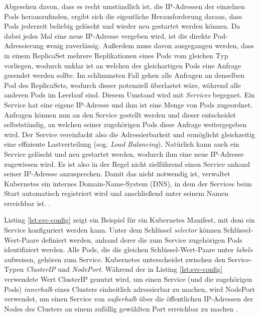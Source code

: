 \documentclass[11pt,a4paper]{article}
\begin{document}
Abgesehen davon, dass es recht umständlich ist, die IP-Adressen der einzelnen Pods herauszufinden,
ergibt sich die eigentliche Herausforderung daraus, dass Pods jederzeit beliebig gelöscht
und wieder neu gestartet werden können. Da dabei jedes Mal eine neue IP-Adresse vergeben wird,
ist die direkte Pod-Adressierung wenig zuverlässig. Außerdem muss davon ausgegangen werden, dass
in einem ReplicaSet mehrere Replikationen eines Pods vom gleichen Typ vorliegen, wodurch unklar ist
an welchen der gleichartigen Pods eine Anfrage gesendet werden sollte. Im schlimmsten Fall gehen alle Anfragen
an denselben Pod des ReplicaSets, wodurch dieser potenziell überlastet wäre, während alle anderen Pods im Leerlauf sind.
Diesem Umstand wird mit \emph{Services} begegnet. Ein Service hat eine eigene IP-Adresse und ihm ist eine Menge
von Pods zugeordnet. Anfragen können nun an den Service gestellt werden und dieser entscheidet selbstständig,
an welchen seiner zugehörigen Pods diese Anfrage weitergegeben wird. Der Service vereinfacht also die
Adressierbarkeit und ermöglicht gleichzeitig eine effiziente Lastverteilung (sog. \emph{Load Balancing}).
Natürlich kann auch ein Service gelöscht und neu gestartet werden, wodurch ihm eine neue IP-Adresse zugewiesen wird.
Es ist also in der Regel nicht zielführend einen Service anhand seiner IP-Adresse anzusprechen.
Damit das nicht notwendig ist, verwaltet Kubernetes ein internes Domain-Name-System (DNS), in dem
der Services beim Start automatisch registriert wird und anschließend unter seinem Namen
erreichbar ist. \cite{Schmeling_Dargatz_2022}.

Listing \ref{lst:svc-config} zeigt ein Beispiel für ein Kubernetes Manifest,
mit dem ein Service konfiguriert werden kann.
Unter dem Schlüssel \emph{selector} können Schlüssel-Wert-Paare definiert werden,
anhand derer die zum Service zugehörigen Pods identifiziert werden. Alle Pods, die
die gleichen Schlüssel-Wert-Paare unter \emph{labels} aufweisen, gehören zum Service.
Kubernetes unterscheidet zwischen den Service-Typen \emph{ClusterIP} und \emph{NodePort}.
Während der in Listing \ref{lst:svc-config} verwendete Wert ClusterIP genutzt wird, um einen Service
(und die zugehörigen Pods) \emph{innerhalb} eines Clusters
einheitlich adressierbar zu machen, wird NodePort verwendet, um einen Service von \emph{außerhalb}
über die öffentlichen IP-Adressen der Nodes des Clusters an einem zufällig gewählten Port erreichbar zu machen \cite{Schmeling_Dargatz_2022}.

\end{document}
